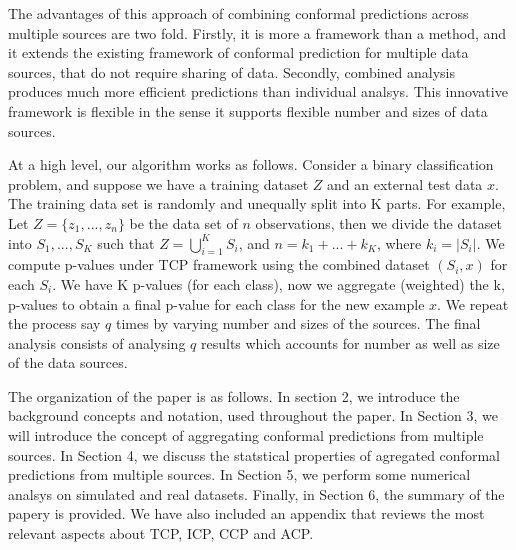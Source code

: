 \documentclass[main]{subfiles}
\begin{document}
The advantages of this approach of combining conformal predictions across multiple sources are two fold. 
Firstly, it is more a framework than a method, and it extends the existing framework of conformal prediction for multiple data sources, that do not require sharing of data. Secondly, combined analysis produces much more efficient predictions than individual analsys. This innovative framework is flexible in the sense it supports flexible number and sizes of data sources.

At a high level, our algorithm works as follows. Consider a binary classification problem, and suppose we have a training dataset $Z$ and an external test data $x$. The training data set is randomly and unequally split into K parts. For example, Let $Z = \{ z_1 , ..., z_n \} $ be the data set of $n$ observations, then we divide the dataset into $S_1, ..., S_K$ such that $Z = \bigcup_{i=1}^K S_i$, and $n = k_1+ ...+k_K$, where $k_i = |S_i|$. We compute p-values under TCP framework using the combined dataset  $(S_i,x)$ for each $S_i$. We have K p-values (for each class), now we aggregate (weighted) the k, p-values to obtain a final p-value for each class for the new example $x$. We repeat the process say $q$ times by varying number and sizes of the sources. The final analysis consists of analysing $q$ results which accounts for number as well as size of the data sources.


The organization of the paper is as follows. In section 2, we introduce the background concepts and notation, used throughout the paper. In Section 3, we will introduce the concept of aggregating conformal predictions from multiple sources. In Section 4, we discuss the statstical properties of agregated conformal predictions from multiple sources. In Section 5, we perform some numerical analsys on simulated and real datasets. Finally, in Section 6, the summary of the papery is provided.
We have also included an appendix that reviews the most relevant aspects about TCP, ICP, CCP and ACP.
\end{document}
